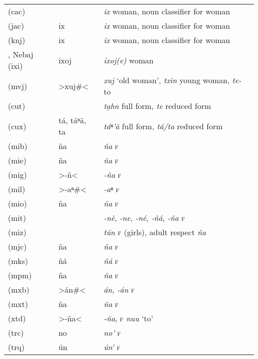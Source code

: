 {\begin{longtable}{L{.25\textwidth}L{.25\textwidth}L{.5\textwidth}}
 (cac)	&		&	\textit{\textquotesingle{}ix} woman, noun classifier for woman	\\
 (jac)	&	ix	&	\textit{ix} woman, noun classifier for woman	\\
 (knj)	&	ix	&	\textit{ix} woman, noun classifier for woman	\\
, Nebaj (ixi)	&	ixoj	&	\textit{ixoj(e)} woman	\\
 (mvj)	&	>xuj\#<	&	\textit{xuj} ‘old woman’, \textit{txin} young woman, \textit{te-} to	\\
 (cut)	&		&	\textit{ta̱hn} full form, \textit{te} reduced form	\\
 (cux)	&	tá, táⁿ\textquotesingle{}ā, ta	&	\textit{táⁿ’ā} full form, \textit{tá/ta} reduced form	\\
 (mib)	&	ña	&	\textit{ña} \textsc{f}	\\
 (mie)	&	ña	&	\textit{ña} \textsc{f}	\\
 (mig)	&	>-ñ<	&	\textit{-ña} \textsc{f}	\\
 (mil)	&	>-aⁿ\#<	&	\textit{-aⁿ} \textsc{f}	\\
 (mio)	&	ña	&	\textit{ña} \textsc{f}	\\
 (mit)	&		&	\textit{‑nè}, \textit{-ne}, \textit{-né}, \textit{‑ñá}, \textit{-ña} \textsc{f}	\\
 (miz)	&		&	\textit{tún} \textsc{f} (girls), adult respect \textit{ña}	\\
 (mjc)	&	ña	&	\textit{ña} \textsc{f}	\\
 (mks)	&	ñá	&	\textit{ñá} \textsc{f}	\\
 (mpm)	&	ña	&	\textit{ña} \textsc{f}	\\
 (mxb)	&	>án\#<	&	\textit{án}, \textit{-án} \textsc{f}	\\
 (mxt)	&	ña	&	\textit{ña} \textsc{f}	\\
 (xtd)	&	>-ña<	&	\textit{‑ña}, \textsc{f} \textit{nuu} ‘to’	\\
 (trc)	&	no\textquotesingle{}	&	\textit{no’} \textsc{f}	\\
 (trq)	&	ún\textquotesingle{}	&	\textit{ún’} \textsc{f}	\\

\end{longtable}}
